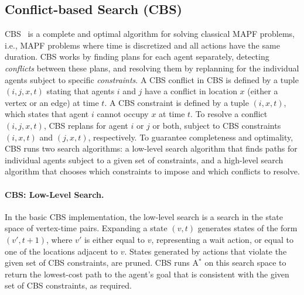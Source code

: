 \documentclass[letterpaper]{article} %
\newcommand{\cbs}{\ac{CBS}\xspace}
\newcommand{\astar}{A$^*$\xspace}
\newcommand{\mapf}{\ac{MAPF}\xspace}
\begin{document}
\subsection{Conflict-based Search (CBS)}


\cbs~\cite{sharon2015conflict} is a complete and optimal algorithm for solving classical \mapf problems, i.e., \mapf problems where time is discretized and all actions have the same duration. 
\cbs works by finding plans for each agent separately, detecting \emph{conflicts} between these plans, and resolving them by replanning for the individual agents subject to specific \emph{constraints}.
A \cbs conflict in \cbs is defined by a tuple $(i,j,x,t)$ 
stating that agents $i$ and $j$ have a conflict in location $x$ (either a vertex or an edge) at time $t$. A \cbs constraint is defined by a tuple $(i,x,t)$, which states that agent $i$ cannot occupy $x$ at time $t$. 
To resolve a conflict $(i,j,x,t)$, \cbs replans for agent $i$ or $j$ or both, subject to \cbs constraints $(i,x,t)$ and $(j,x,t)$, respectively. 
To guarantee completeness and optimality, \cbs runs two search algorithms: a low-level search algorithm that finds paths for individual agents subject to a given set of constraints, and a high-level search algorithm that chooses which constraints to impose and which conflicts to resolve. 


\paragraph{\cbs: Low-Level Search.}
In the basic \cbs implementation, the low-level search is a search in the state space of vertex-time pairs. 
Expanding a state $(v,t)$ generates states of the form $(v',t+1)$, where $v'$ is either equal to $v$, representing a wait action, or equal to one of the locations adjacent to $v$. 
States generated by actions that violate the given set of \cbs constraints, are pruned. 
\cbs runs \astar on this search space to return the lowest-cost path to the agent's goal that is consistent with the given set of \ac{CBS} constraints, as required.
\end{document}
